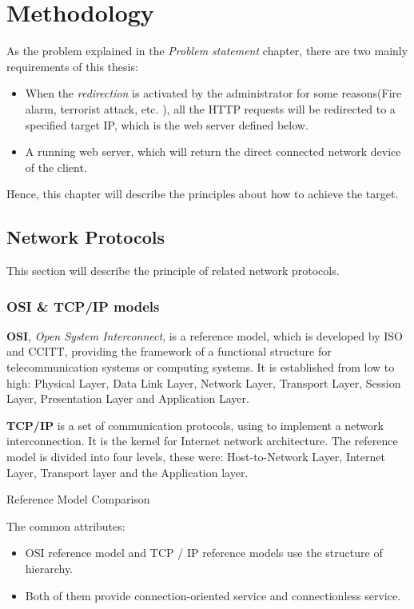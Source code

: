 \newpage
\chapter{Methodology}

As the problem explained in the \textit{Problem statement} chapter, there are two mainly requirements of this thesis:

\begin{itemize}
	\item When the \textit{redirection} is activated by the administrator for some reasons(Fire alarm, terrorist attack, etc. ), all the HTTP requests will be redirected to a specified target IP, which is the web server defined below.
	\item A running web server, which will return the direct connected network device of the client.
\end{itemize}

Hence, this chapter will describe the principles about how to achieve the target.

\section{Network Protocols}

This section will describe the principle of related network protocols.

\subsection{OSI \& TCP/IP models}

\textbf{OSI}, \textit{Open System Interconnect}, is a reference model, which is developed by ISO and CCITT, providing the framework of a functional structure for telecommunication systems or computing systems. It is established from low to high: Physical Layer, Data Link Layer, Network Layer, Transport Layer, Session Layer, Presentation Layer and Application Layer.

\textbf{TCP/IP} is a set of communication protocols, using to implement a network interconnection. It is the kernel for Internet network architecture. The reference model is divided into four levels, these were: Host-to-Network Layer, Internet Layer, Transport layer and the Application layer.  

Reference Model Comparison  

The common attributes:  

\begin{itemize}
	\item OSI reference model and TCP / IP reference models use the structure of hierarchy.  
	\item Both of them provide connection-oriented service and connectionless service.  
\end{itemize}

